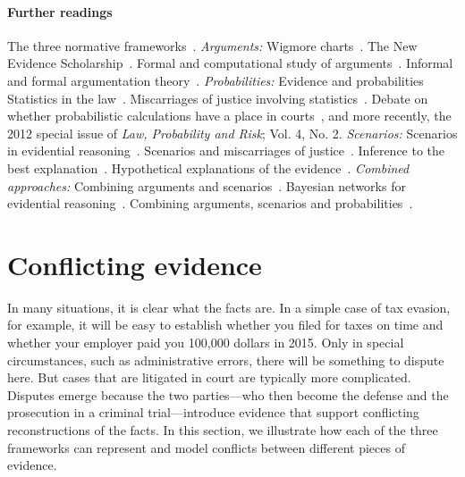 \documentclass[10pt]{article}
\begin{document}

\paragraph{Further readings} 
The three normative frameworks~\citep{andersonEtal2005,kapteinEtal2009,dawidEtal2011}. 
%
\textit{Arguments:} Wigmore charts~\citep{wigmore1913}. The New Evidence Scholarship~\citep{andersonEtal2005}. 
Formal and computational study of arguments~\citep{pollock1987,pollock1995}.
Informal and formal argumentation theory~\citep{vanEemerenEtal2014}.
%
\textit{Probabilities:}
Evidence and probabilities~\citep{schum1994,morteraDawid2007}
Statistics in the law~\citep{fenton2011}. Miscarriages of justice involving statistics~\citep{dawidEtal2011,schnepsColmez2013}.
Debate on whether probabilistic calculations have a place in courts~\citet{finkelsteinFairley1970,tribe1971}, and more recently, 
the 2012 special issue of \textit{Law, Probability and Risk}; Vol. 4, No. 2. 
%
\textit{Scenarios:}
Scenarios in evidential reasoning~\citep{bennettFeldman1981,penningtonHastie1993,penningtonHastie1993StoryModel}. Scenarios and miscarriages of justice~\citep{wagenaarEtal1993}. Inference to the best explanation~\citep{pardoAllen2008}. Hypothetical explanations of the evidence~\citep{thagard1989}. 
%
\textit{Combined approaches:}
Combining arguments and scenarios~\citep{bexEtal2010,bex2011}. 
Bayesian networks for evidential reasoning~\citep{heplerEtal2007,fentonNeilLagnado2013}. 
Combining arguments, scenarios and probabilities~\citep{vlekEtal2016,timmerEtAl2017, verheijEtal2016,verheij2014,verheij2017}. 

\section{Conflicting evidence}
\label{sec:conf}
 	

In many situations, it is clear what the facts are. In a simple case of tax evasion, for example, 
it will be easy to establish whether you filed for taxes on time and whether your employer paid you 100,000 dollars in 2015. Only in special circumstances, 
such as administrative errors, there will be something to dispute here. 
But cases that are litigated in court are typically more complicated.
Disputes emerge because the two parties---who then become the defense and the 
prosecution in a criminal trial---introduce evidence that support conflicting 
reconstructions of the facts. In this section, we illustrate how 
each of the three frameworks can represent and model conflicts 
between different pieces of evidence. 
\end{document}

